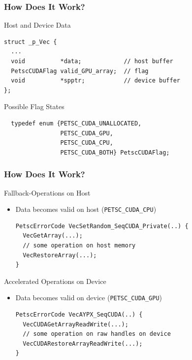 \begin{frame}[fragile]
\frametitle{How Does It Work?}
  \begin{block}{Host and Device Data}
  \begin{lstlisting}
struct _p_Vec {
  ...
  void          *data;            // host buffer
  PetscCUDAFlag valid_GPU_array;  // flag
  void          *spptr;           // device buffer
};
  \end{lstlisting}
  \end{block}

  \begin{block}{Possible Flag States}
  \begin{lstlisting}
  typedef enum {PETSC_CUDA_UNALLOCATED,
                PETSC_CUDA_GPU,
                PETSC_CUDA_CPU,
                PETSC_CUDA_BOTH} PetscCUDAFlag;
  \end{lstlisting}
  \end{block}

\end{frame}

\begin{frame}[fragile]
\frametitle{How Does It Work?}

  \begin{block}{Fallback-Operations on Host}
   \begin{itemize}
    \item Data becomes valid on host (\lstinline|PETSC_CUDA_CPU|)
      \begin{lstlisting}
PetscErrorCode VecSetRandom_SeqCUDA_Private(..) {
  VecGetArray(...);
  // some operation on host memory
  VecRestoreArray(...);
}
      \end{lstlisting}
   \end{itemize}
  \end{block}

  
  \begin{block}{Accelerated Operations on Device}
   \begin{itemize}
    \item Data becomes valid on device (\lstinline|PETSC_CUDA_GPU|)
      \begin{lstlisting}
PetscErrorCode VecAYPX_SeqCUDA(..) {
  VecCUDAGetArrayReadWrite(...);
  // some operation on raw handles on device
  VecCUDARestoreArrayReadWrite(...);
}
      \end{lstlisting}
   \end{itemize}
  \end{block}

\end{frame}


